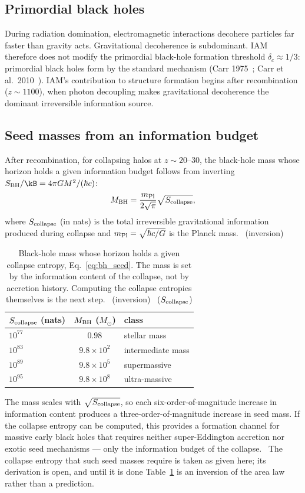 \subsection{Primordial black holes}
During radiation domination, electromagnetic interactions decohere particles far faster than gravity acts. Gravitational decoherence is subdominant. IAM
therefore does not modify the primordial black-hole formation threshold $\delta_c\approx1/3$: primordial black holes form by the standard mechanism (Carr
1975~\cite{Carr1975}; Carr et al.\ 2010~\cite{Carr2010}). IAM's contribution to structure formation begins after recombination ($z\sim1100$), when photon decoupling makes
gravitational decoherence the dominant irreversible information source. \interp

\subsection{Seed masses from an information budget}
After recombination, for collapsing halos at $z\sim20$--30, the black-hole mass whose horizon holds a given information budget follows from inverting
$S_{\rm BH}/\kB=4\pi GM^2/(\hbar c)$:
\begin{equation}
M_{\rm BH}=\frac{m_{\rm Pl}}{2\sqrt\pi}\sqrt{S_{\rm collapse}},\label{eq:bh_seed}
\end{equation}
where $S_{\rm collapse}$ (in nats) is the total irreversible gravitational information produced during collapse and $m_{\rm Pl}=\sqrt{\hbar c/G}$ is the Planck mass.
\derived\ (inversion)
\begin{table}[htbp]\centering\small
\caption{Black-hole mass whose horizon holds a given collapse entropy, Eq.~\eqref{eq:bh_seed}. The mass is set by the information content of the collapse, not by
accretion history. Computing the collapse entropies themselves is the next step. \calc\ (inversion) \openprob\ ($S_{\rm collapse}$)}\label{tab:bh_seed}
\begin{tabular}{lcl}\toprule
$S_{\rm collapse}$ (nats) & $M_{\rm BH}$ ($M_\odot$) & class\\\midrule
$10^{77}$ & $0.98$ & stellar mass\\
$10^{83}$ & $9.8\times10^{2}$ & intermediate mass\\
$10^{89}$ & $9.8\times10^{5}$ & supermassive\\
$10^{95}$ & $9.8\times10^{8}$ & ultra-massive\\\bottomrule
\end{tabular}
\end{table}
The mass scales with $\sqrt{S_{\rm collapse}}$, so each six-order-of-magnitude increase in information content produces a three-order-of-magnitude increase in seed
mass. If the collapse entropy can be computed, this provides a formation channel for massive early black holes that requires neither super-Eddington
accretion nor exotic seed mechanisms --- only the information budget of the collapse. \conjecture\ The collapse entropy that such seed masses require is taken as given here; its derivation is open, and until it is done Table~\ref{tab:bh_seed} is an inversion of the area law rather than a prediction. \openprob

